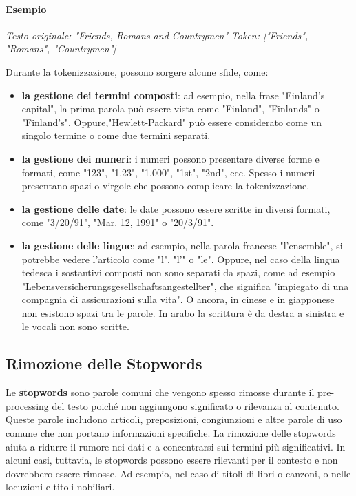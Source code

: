 \documentclass{report}
\begin{document}
	\paragraph{Esempio}
	\begin{center}
		\textit{Testo originale: "Friends, Romans and Countrymen"}
		\textit{Token: ["Friends", "Romans", "Countrymen"]}
	\end{center}

	Durante la tokenizzazione, possono sorgere alcune sfide, come:
	\begin{itemize}
		\item \textbf{la gestione dei termini composti}: ad esempio, nella frase "Finland's capital", la prima parola può essere vista come "Finland", "Finlands" o "Finland's". Oppure,"Hewlett-Packard" può essere considerato come un singolo termine o come due termini separati.
		\item \textbf{la gestione dei numeri}: i numeri possono presentare diverse forme e formati, come "123", "1.23", "1,000", "1st", "2nd", ecc.  Spesso i numeri presentano spazi o virgole che possono complicare la tokenizzazione.
		\item \textbf{la gestione delle date}: le date possono essere scritte in diversi formati, come "3/20/91", "Mar. 12, 1991" o "20/3/91".
		\item \textbf{la gestione delle lingue}: ad esempio, nella parola francese "l'ensemble", si potrebbe vedere l'articolo come "l", "l'" o "le". Oppure, nel caso della lingua tedesca i sostantivi composti non sono separati da spazi, come ad esempio "Lebensversicherungsgesellschaftsangestellter", che significa "impiegato di una compagnia di assicurazioni sulla vita". O ancora, in cinese e in giapponese non esistono spazi tra le parole. In arabo la scrittura è da destra a sinistra e le vocali non sono scritte.
	\end{itemize}

	\subsection{Rimozione delle Stopwords}
	Le \textbf{stopwords} sono parole comuni che vengono spesso rimosse durante il pre-processing del testo poiché non aggiungono significato o rilevanza al contenuto. Queste parole includono articoli, preposizioni, congiunzioni e altre parole di uso comune che non portano informazioni specifiche. La rimozione delle stopwords aiuta a ridurre il rumore nei dati e a concentrarsi sui termini più significativi. In alcuni casi, tuttavia, le stopwords possono essere rilevanti per il contesto e non dovrebbero essere rimosse. Ad esempio, nel caso di titoli di libri o canzoni, o nelle locuzioni e titoli nobiliari.
\end{document}
